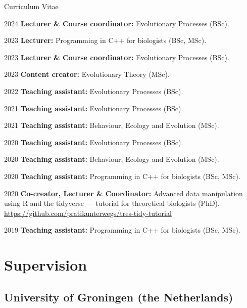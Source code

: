 \documentclass[11pt,a4paper]{article}
\begin{document}
\begin{cv}{Curriculum Vitae}
\begin{cvlist}{}
            \item[2024]
			\textbf{Lecturer \& Course coordinator:} Evolutionary Processes (BSc).

            \item[2023]
			\textbf{Lecturer:} Programming in C++ for biologists (BSc, MSc).
            
			\item[2023]
			\textbf{Lecturer \& Course coordinator:} Evolutionary Processes (BSc).

            \item[2023]
			\textbf{Content creator:} Evolutionary Theory (MSc).

            \item[2022] \textbf{Teaching assistant:} Evolutionary Processes (BSc). 

            \item[2021] \textbf{Teaching assistant:} Evolutionary Processes (BSc). 

            \item[2021] \textbf{Teaching assistant:} Behaviour, Ecology and Evolution (MSc). 
            
			\item[2020] \textbf{Teaching assistant:} Evolutionary Processes (BSc).
            
			\item[2020] \textbf{Teaching assistant:} Behaviour, Ecology and Evolution (MSc). 

            \item[2020] \textbf{Teaching assistant:} Programming in C++ for biologists (BSc, MSc).
			
			\item[2020] \textbf{Co-creator, Lecturer \& Coordinator:} Advanced data manipulation using R and the tidyverse --- tutorial for theoretical biologists (PhD).\\
            \url{https://github.com/pratikunterwegs/tres-tidy-tutorial}
            
			\item[2019] \textbf{Teaching assistant:} Programming in C++ for biologists (BSc, MSc).
			
		\end{cvlist}

        \section{Supervision}

        \subsection{University of Groningen (the Netherlands)}


\end{cv}
\end{document}

